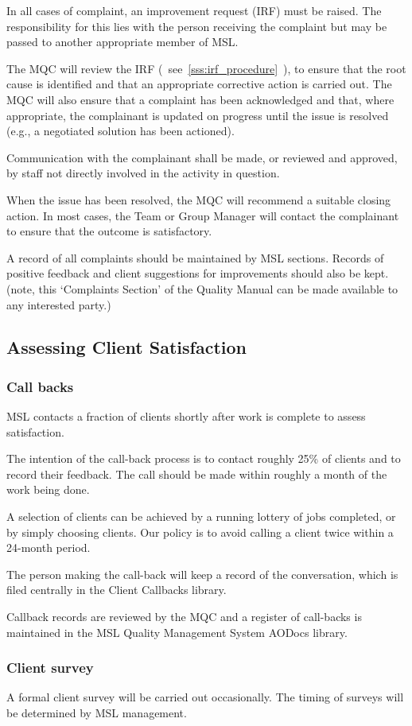 In all cases of complaint, an improvement request (IRF) must be raised. The responsibility for this lies with the person receiving the complaint but may be passed to another appropriate member of MSL.

The MQC will review the IRF (~see~\ref{sss:irf_procedure}~), to ensure that the root cause is identified and that an appropriate corrective action is carried out.  
The MQC will also ensure that a complaint has been acknowledged and that, where appropriate, the complainant is updated on progress until the issue is resolved (e.g., a negotiated solution has been actioned). 

Communication with the complainant shall be made, or reviewed and approved, by staff not directly involved in the activity in question.

When the issue has been resolved, the MQC will recommend a suitable closing action. In most cases, the Team or Group Manager will contact the complainant to ensure that the outcome is satisfactory. 

A record of all complaints should be maintained by MSL sections. Records of positive feedback and client suggestions for improvements should also be kept.
(note, this `Complaints Section' of the Quality Manual can be made available to any interested party.)

\subsection{Assessing Client Satisfaction}
\label{ss:client_satisfaction}
\subsubsection{Call backs}
MSL contacts a fraction of clients shortly after work is complete to assess satisfaction.

The intention of the call-back process is to contact roughly 25\% of clients and to record their feedback. The call should be made within roughly a month of the work being done.

A selection of clients can be achieved by a running lottery of jobs completed, or by simply choosing clients. Our policy is to avoid calling a client twice within a 24-month period.

The person making the call-back will keep a record of the conversation, which is filed centrally in the Client Callbacks library. 

Callback records are reviewed by the MQC and a register of call-backs is maintained in the MSL Quality Management System AODocs library.

\subsubsection{Client survey}
A formal client survey will be carried out occasionally. The timing of surveys will be determined by MSL management.